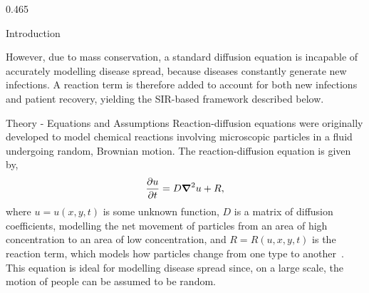 \documentclass{beamer} %
\begin{document}
\begin{frame}[t]
\begin{columns}[t]
\begin{column}{0.465\textwidth}
\begin{block}{Introduction}
	\bigskip
	
	However, due to mass conservation, a standard diffusion equation is incapable of accurately modelling disease spread, because diseases constantly generate new infections. A reaction term is therefore added to account for both new infections and patient recovery, yielding the SIR-based framework described below.
\end{block}


\begin{block}{Theory - Equations and Assumptions} 
	Reaction-diffusion equations were originally developed to model chemical
	reactions involving microscopic particles in a fluid undergoing random,
	Brownian motion. The reaction-diffusion equation is given by,
	\begin{equation}
		\pdv{u}{t} = D\grad^2u + R,
	\end{equation}
	where $u = u(x,y,t)$ is some unknown function, $D$ is a matrix of diffusion coefficients, modelling the net movement of particles from an area of high concentration to an area of low concentration, and $R = R(u, x, y, t)$ is the reaction term, which models how particles change from one type to another~\cite{turing1952chemical}. This equation is ideal for modelling disease spread since, on a large scale, the motion of people can be assumed to be random.
	
	\bigskip
	

\end{block}
\end{column}
\end{columns}
\end{frame}
\end{document}
